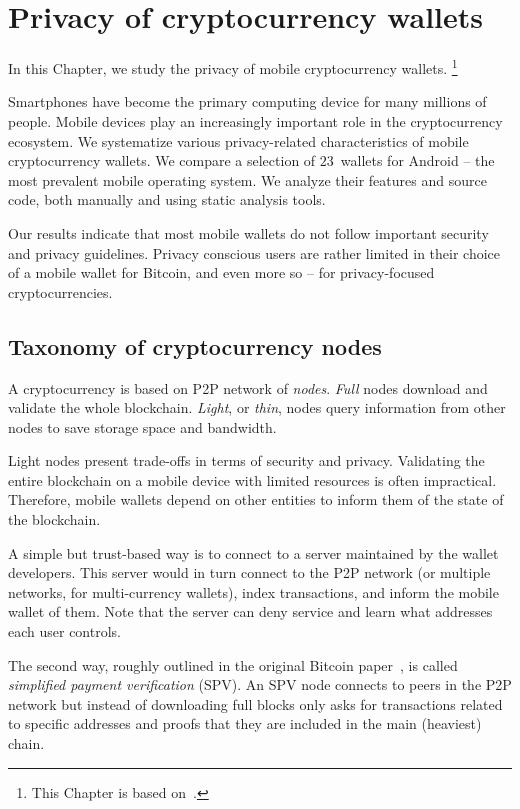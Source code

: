 \chapter{Privacy of cryptocurrency wallets}

\label{Chapter04Wallets}

In this Chapter, we study the privacy of mobile cryptocurrency wallets.
\footnote{This Chapter is based on~\cite{Biryukov2019}.}

Smartphones have become the primary computing device for many millions of people.
Mobile devices play an increasingly important role in the cryptocurrency ecosystem.
We systematize various privacy-related characteristics of mobile cryptocurrency wallets.
We compare a selection of $23$~wallets for Android -- the most prevalent mobile operating system.
We analyze their features and source code, both manually and using static analysis tools.

Our results indicate that most mobile wallets do not follow important security and privacy guidelines.
Privacy conscious users are rather limited in their choice of a mobile wallet for Bitcoin, and even more so -- for privacy-focused cryptocurrencies.


\section{Taxonomy of cryptocurrency nodes}

A cryptocurrency is based on P2P network of \textit{nodes}.
\textit{Full} nodes download and validate the whole blockchain.
\textit{Light}, or \textit{thin}, nodes query information from other nodes to save storage space and bandwidth.

Light nodes present trade-offs in terms of security and privacy.
Validating the entire blockchain on a mobile device with limited resources is often impractical.
Therefore, mobile wallets depend on other entities to inform them of the state of the blockchain.

A simple but trust-based way is to connect to a server maintained by the wallet developers.
This server would in turn connect to the P2P network (or multiple networks, for multi-currency wallets), index transactions, and inform the mobile wallet of them.
Note that the server can deny service and learn what addresses each user controls.

The second way, roughly outlined in the original Bitcoin paper~\cite{Nakamoto2008}, is called \textit{simplified payment verification} (SPV).
An SPV node connects to peers in the P2P network but instead of downloading full blocks only asks for transactions related to specific addresses and proofs that they are included in the main (heaviest) chain.

